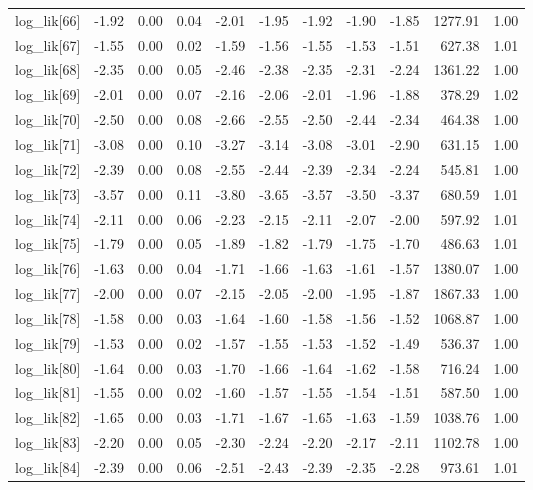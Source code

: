 \begin{table}[ht]
\begin{tabular}{rrrrrrrrrrr}
  log\_lik[66] & -1.92 & 0.00 & 0.04 & -2.01 & -1.95 & -1.92 & -1.90 & -1.85 & 1277.91 & 1.00 \\ 
  log\_lik[67] & -1.55 & 0.00 & 0.02 & -1.59 & -1.56 & -1.55 & -1.53 & -1.51 & 627.38 & 1.01 \\ 
  log\_lik[68] & -2.35 & 0.00 & 0.05 & -2.46 & -2.38 & -2.35 & -2.31 & -2.24 & 1361.22 & 1.00 \\ 
  log\_lik[69] & -2.01 & 0.00 & 0.07 & -2.16 & -2.06 & -2.01 & -1.96 & -1.88 & 378.29 & 1.02 \\ 
  log\_lik[70] & -2.50 & 0.00 & 0.08 & -2.66 & -2.55 & -2.50 & -2.44 & -2.34 & 464.38 & 1.00 \\ 
  log\_lik[71] & -3.08 & 0.00 & 0.10 & -3.27 & -3.14 & -3.08 & -3.01 & -2.90 & 631.15 & 1.00 \\ 
  log\_lik[72] & -2.39 & 0.00 & 0.08 & -2.55 & -2.44 & -2.39 & -2.34 & -2.24 & 545.81 & 1.00 \\ 
  log\_lik[73] & -3.57 & 0.00 & 0.11 & -3.80 & -3.65 & -3.57 & -3.50 & -3.37 & 680.59 & 1.01 \\ 
  log\_lik[74] & -2.11 & 0.00 & 0.06 & -2.23 & -2.15 & -2.11 & -2.07 & -2.00 & 597.92 & 1.01 \\ 
  log\_lik[75] & -1.79 & 0.00 & 0.05 & -1.89 & -1.82 & -1.79 & -1.75 & -1.70 & 486.63 & 1.01 \\ 
  log\_lik[76] & -1.63 & 0.00 & 0.04 & -1.71 & -1.66 & -1.63 & -1.61 & -1.57 & 1380.07 & 1.00 \\ 
  log\_lik[77] & -2.00 & 0.00 & 0.07 & -2.15 & -2.05 & -2.00 & -1.95 & -1.87 & 1867.33 & 1.00 \\ 
  log\_lik[78] & -1.58 & 0.00 & 0.03 & -1.64 & -1.60 & -1.58 & -1.56 & -1.52 & 1068.87 & 1.00 \\ 
  log\_lik[79] & -1.53 & 0.00 & 0.02 & -1.57 & -1.55 & -1.53 & -1.52 & -1.49 & 536.37 & 1.00 \\ 
  log\_lik[80] & -1.64 & 0.00 & 0.03 & -1.70 & -1.66 & -1.64 & -1.62 & -1.58 & 716.24 & 1.00 \\ 
  log\_lik[81] & -1.55 & 0.00 & 0.02 & -1.60 & -1.57 & -1.55 & -1.54 & -1.51 & 587.50 & 1.00 \\ 
  log\_lik[82] & -1.65 & 0.00 & 0.03 & -1.71 & -1.67 & -1.65 & -1.63 & -1.59 & 1038.76 & 1.00 \\ 
  log\_lik[83] & -2.20 & 0.00 & 0.05 & -2.30 & -2.24 & -2.20 & -2.17 & -2.11 & 1102.78 & 1.00 \\ 
  log\_lik[84] & -2.39 & 0.00 & 0.06 & -2.51 & -2.43 & -2.39 & -2.35 & -2.28 & 973.61 & 1.01 \\ 

\end{tabular}
\end{table}
